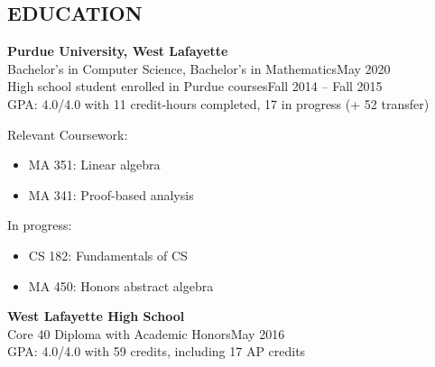 \documentclass[line,margin]{res}
\begin{document}
\begin{resume}



  \section{EDUCATION}
  {\bf\rmfamily Purdue University, West Lafayette}\\
  Bachelor's in Computer Science, Bachelor's in Mathematics\hfill May 2020\\
  High school student enrolled in Purdue courses\hfill Fall 2014 -- Fall 2015\\
  GPA: 4.0/4.0 with 11 credit-hours completed, 17 in progress (+ 52 transfer)
  \multicolsep 0pt
  \begin{multicols}{2}
  Relevant Coursework:
  \begin{itemize} \itemsep -2pt
  \item MA 351: Linear algebra
  \item MA 341: Proof-based analysis
  \end{itemize}
  In progress:
  \begin{itemize} \itemsep -2pt
  \item CS 182: Fundamentals of CS
  \item MA 450: Honors abstract algebra
  \end{itemize}
  \end{multicols}


  {\bf\rmfamily West Lafayette High School}\\
  Core 40 Diploma with Academic Honors\hfill May 2016\\
  GPA: 4.0/4.0 with 59 credits, including 17 AP credits%



\end{resume}
\end{document}
